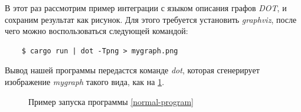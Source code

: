 В этот раз рассмотрим пример интеграции с языком описания графов \emph{DOT}, и сохраним результат как рисунок.
Для этого требуется установить \emph{graphviz}, после чего можно воспользоваться следующей командой:
\begin{verbatim}
    $ cargo run | dot -Tpng > mygraph.png
\end{verbatim}

Вывод нашей программы передастся команде \emph{dot}, которая сгенерирует изображение \emph{mygraph} такого вида,
как на \ref{normal-out-image}.

\begin{figure}[h]
    \centering
    
    \caption{Пример запуска программы \ref{normal-program}}
    \label{normal-out-image}
\end{figure}


\pagebreak